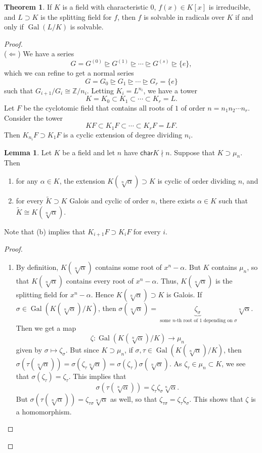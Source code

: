 \documentclass[10pt,letterpaper,cm]{nupset}
\theoremstyle{definition}
\newtheorem{theorem}{Theorem}
\newtheorem{lemma}{Lemma}
\newcommand{\Z}{\mathbb Z}
\newcommand{\1}{\mathbf{1}}
\newcommand{\0}{\vec 0}
\newcommand{\Char}{\mathsf{char}}
\DeclareMathOperator{\gal}{Gal}
\begin{document}
\begin{theorem}
If $K$ is a field with characteristic $0$, $f(x) \in K[x]$ is irreducible, and $L \supset K$ is the splitting field for $f$, then  $f$ is solvable in radicals over $K$ if and only if $\gal(L/K)$ is solvable. 
\end{theorem}
\begin{proof} $ $
\\
($\Longleftarrow$) We have a series $$ G = G^{(0)} \unrhd G^{(1)} \unrhd \cdots \unrhd G^{(s)} \unrhd \{e\} ,$$ which we can refine to get a normal series $$  G=G_0 \unrhd G_1 \unrhd \cdots \unrhd G_r = \{e\}  $$ such that $G_{i+1}/G_i \cong \Z/n_i$. Letting $K_i = L^{n_i}$, we have a tower $$ K= K_0 \subset K_1 \subset \cdots \subset K_r = L  .$$ Let $F$ be the cyclotomic field that contains all roots of $1$ of order $n= n_1n_2 \cdots n_r$. Consider the tower $$KF \subset K_1F \subset \cdots \subset K_r F = LF.$$  Then $K_{n_i}F \supset K_1F$ is a cyclic extension of degree dividing $n_i$.
\begin{lemma}
Let $K$ be a field and let $n$ have $\Char{K} \nmid n$. Suppose that $K \supset \mu_n$. Then
\begin{enumerate}[label=(\alph*)]
\item for any $\alpha \in K$, the extension $K(\sqrt[n]{\alpha}) \supset K$  is cyclic of order dividing $n$, and
\item for every $\widetilde{K} \supset K$ Galois and cyclic of order $n$, there exists $\alpha \in K$ such that $\widetilde{K} \cong K(\sqrt[n]{\alpha})$.
\end{enumerate}
Note that (b) implies that $K_{i+1}F \supset K_iF$ for every $i$.
\end{lemma}
\begin{proof} $ $
\begin{enumerate}[label=(\alph*)]
\item By definition, $K(\sqrt[n]{\alpha})$ contains some root of $x^n - \alpha$. But $K$ contains $\mu_n$, so that $K(\sqrt[n]{\alpha})$ contains every root of $x^n - \alpha$. Thus, $K(\sqrt[n]{\alpha})$ is the splitting field for $x^n - \alpha$. Hence $K(\sqrt[n]{\alpha}) \supset K$ is Galois.
 If $\sigma \in \gal(K(\sqrt[n]{\alpha}) / K)$, then $ \sigma(\sqrt[n]{\alpha}) = \underbrace{\zeta_{\sigma}}_{\text{ some } n\text{-th root of 1 depending on } \sigma} \sqrt[n]{\alpha}$. Then we get a map $$\zeta : \gal(K(\sqrt[n]{\alpha})/K) \to \mu_n$$ given by $ \sigma \mapsto \zeta_{\sigma}$. But since $K \supset \mu_n$, if $\sigma, \tau \in \gal(K(\sqrt[n]{\alpha})/K)$, then $\sigma(\tau(\sqrt[n]{\alpha})) = \sigma(\zeta_{\tau}\sqrt[n]{\alpha})= \sigma(\zeta_{\tau})\sigma(\sqrt[n]{\alpha})$. As $\zeta_{\tau} \in \mu_n \subset K$, we see that $\sigma(\zeta_{\tau}) = \zeta_{\tau}$. This implies that $$ \sigma(\tau(\sqrt[n]{\alpha})) =  \zeta_{\tau}\zeta_{\sigma}\sqrt[n]{\alpha} .$$ But $\sigma(\tau(\sqrt[n]{\alpha})) = \zeta_{\tau \sigma}\sqrt[n]{\alpha}$ as well, so that $\zeta_{\tau \sigma} = \zeta_{\tau} \zeta_{\sigma}$. This shows that $\zeta$ is a homomorphism. 
 

\end{enumerate}
\end{proof}
\end{proof}
\end{document}
